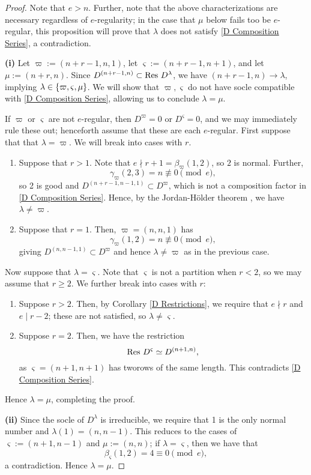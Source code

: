 \documentclass{amsart}
\begin{document}
  \begin{proof}
    Note that $e > n$.
    Further, note that the above characterizations are necessary regardless of $e$-regularity;
    in the case that $\mu$ below fails too be $e$-regular, this proposition will prove that $\lambda$ does not satisfy \ref{D Composition Series}, a contradiction.

    \textbf{(i)}
    Let $\varpi := (n+r-1,n,1)$, let $\varsigma := (n+r-1,n+1)$, and let $\mu := (n + r,n)$.
    Since $D^{(n+r-1,n)} \subset \operatorname{Res} \, D^\lambda$, we have $(n + r - 1,n) \longrightarrow \lambda$, implying $\lambda \in \left\{ \varpi,\varsigma,\mu \right\}$.
    We will show that $\varpi, \varsigma$ do not have socle compatible with \eqref{D Composition Series}, allowing us to conclude $\lambda = \mu$.
    
    If $\varpi$ or $\varsigma$ are not $e$-regular, then $D^\varpi = 0$ or $D^\varsigma = 0$, and we may immediately rule these out;
    henceforth assume that these are each $e$-regular.
    First suppose that that $\lambda = \varpi$.
    We will break into cases with $r$.
    \begin{enumerate}[label={\textit{Case \arabic*.}}]
      \item Suppose that $r > 1$.
        Note that $e \nmid r + 1 = \beta_\varpi(1,2)$, so $2$ is normal.
        Further, \[\gamma_\varpi(2,3) = n \not\equiv 0 \pmod e,\] so 2 is good and $D^{(n+r-1,n-1,1)} \subset D^\varpi$, which is not a composition factor in \eqref{D Composition Series}.
        Hence, by the Jordan-H\"older theorem \cite[Thm.~3.7.1]{Etingof}, we have $\lambda \neq \varpi$.

      \item Suppose that $r = 1$.
        Then, $\varpi = (n,n,1)$ has \[\gamma_{\varpi}(1,2) = n \not\equiv 0 \pmod e,\] giving $D^{(n,n-1,1)} \subset D^\varpi$ and hence $\lambda \neq \varpi$ as in the previous case.
    \end{enumerate} 

  \vspace{5pt}
  Now suppose that $\lambda = \varsigma$.
  Note that $\varsigma$ is not a partition when $r < 2$, so we may assume that $r \geq 2$.
  We further break into cases with $r$:
  \begin{enumerate}[label={\textit{Case \arabic*.}}]
    \item Suppose $r > 2$.
      Then, by Corollary \ref{D Restrictions}, we require that $e \nmid r$ and $e \mid r - 2$;
      these are not satisfied, so $\lambda \neq \varsigma$.
    \item Suppose $r = 2$.
      Then, we have the restriction \[\operatorname{Res} \, D^\varsigma \simeq D^{(n+1,n)},\] as $\varsigma = (n+1,n+1)$ has tworows of the same length.
      This contradicts \eqref{D Composition Series}. 
  \end{enumerate}
  Hence $\lambda = \mu$, completing the proof.

  \textbf{(ii)}
  Since the socle of $D^\lambda$ is irreducible, we require that 1 is the only normal number and $\lambda(1) = (n,n-1)$.
  This reduces to the cases of $\varsigma := (n + 1, n - 1)$ and $\mu := (n,n)$;
  if $\lambda = \varsigma$, then we have that \[\beta_\varsigma(1,2) = 4 \equiv 0 \pmod e,\] a contradiction.
  Hence $\lambda = \mu$.
\end{proof}
\end{document}

